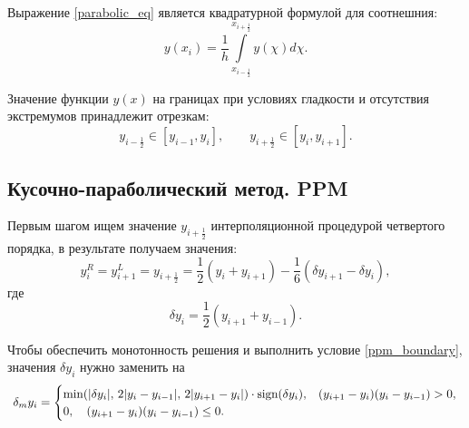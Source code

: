 \documentclass[12pt,a4paper]{article}
\newcommand{\half}{\frac{1}{2}}
\newcommand{\dhalf}{\dfrac{1}{2}}
\newcommand*{\Scale}[2][4]{\scalebox{#1}{$#2$}}
\begin{document}
    Выражение \eqref{parabolic_eq} является квадратурной формулой для соотнешния:
    \[
        y(x_i) = \dfrac{1}{h} \displaystyle \int\limits_{x_{i-\half}}^{x_{i+\half}} y(\chi) d\chi.
    \]

   Значение функции $ y(x) $ на границах при условиях гладкости и отсутствия экстремумов принадлежит отрезкам:
   \begin{equation}
        \label{ppm_boundary}
        y_{i-\half} \in [y_{i-1}, y_i], \qquad y_{i+\half} \in [y_i, y_{i+1}].
   \end{equation}

   \subsection{Кусочно-параболический метод. PPM}

   Первым шагом ищем значение $y_{i+\half}$ интерполяционной процедурой четвертого порядка, в результате получаем значения:
   \[
        y_i^R = y_{i+1}^L = y_{i+\half} = \dhalf(y_i + y_{i+1}) - \dfrac{1}{6}(\delta y_{i+1} - \delta y_i),
   \] 
   \noindent где 
   \[
        \delta y_i = \dhalf(y_{i+1} + y_{i-1}).
   \]

    Чтобы обеспечить монотонность решения и выполнить условие \eqref{ppm_boundary}, значения $ \delta y_i $ нужно заменить на 
    \[
        \Scale[0.95] {
            \delta_m y_i = 
            \begin{cases}
                \min(|\delta y_i|,\, 2|y_i - y_{i-1}|,\, 2|y_{i+1} - y_i|)\cdot \text{sign}(\delta y_i), & (y_{i+1} - y_i)(y_i - y_{i-1}) > 0, \\
                0, \quad (y_{i+1} - y_i)(y_i - y_{i-1}) \leq 0.
            \end{cases}  
        }
    \]

    \pagebreak
\end{document}
